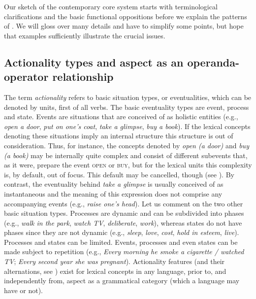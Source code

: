 \documentclass[output=paper]{langsci/langscibook}
\begin{document}
Our sketch of the contemporary core system starts with terminological clarifications and the basic functional oppositions before we explain the patterns of . We will gloss over many details and have to simplify some points, but hope that examples sufficiently illustrate the crucial issues.

\subsection{Actionality types and aspect as an operanda-operator relationship}\label{sec:wiemerserzant:2.1}

The term \textit{actionality} refers to basic situation types, or eventualities, which can be denoted by  units, first of all verbs. The basic eventuality types are event, process and state. Events are situations that are conceived of as holistic entities (e.g., \textit{open a door}, \textit{put on one’s coat}, \textit{take a glimpse}, \textit{buy a book}). If the lexical concepts denoting these situations imply an internal structure this structure is out of consideration. Thus, for instance, the concepts denoted by \textit{open (a door)} and \textit{buy (a book)} may be internally quite complex and consist of different subevents that, as it were, prepare the event \textsc{open} or \textsc{buy}, but for the lexical units this complexity is, by default, out of focus. This default may be cancelled, though (see ). By contrast, the eventuality behind \textit{take a glimpse} is usually conceived of as instantaneous and the meaning of this expression does not comprise any accompanying events (e.g., \textit{raise one’s head}). Let us comment on the two other basic situation types. Processes are dynamic and can be subdivided into phases (e.g., \textit{walk in the park}, \textit{watch TV}, \textit{deliberate}, \textit{work}), whereas states do not have phases since they are not dynamic (e.g., \textit{sleep}, \textit{love}, \textit{cost}, \textit{hold in esteem}, \textit{live}). Processes and states can be limited. Events, processes and even states can be made subject to repetition (e.g., \textit{Every morning he smoke a cigarette / watched TV}; \textit{Every second year she was pregnant}). Actionality features (and their alternations, see ) exist for lexical concepts in any language, prior to, and independently from, aspect as a grammatical category (which a language may have or not).
\end{document}
